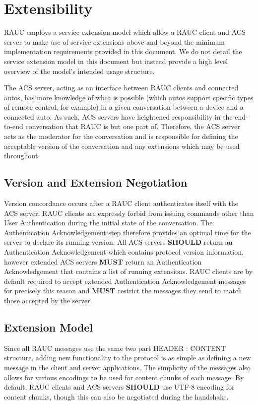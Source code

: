 
\section{Extensibility}
\label{sec:ext}
RAUC employs a service extension model which allow a RAUC client and ACS server to make use of service extensions above and beyond the minimum implementation requirements provided in this document. We do not detail the service extension model in this document but instead provide a high level overview of the model's intended usage structure.

The ACS server, acting as an interface between RAUC clients and connected autos,  has more knowledge of what is possible (which autos support specific types of remote control, for example) in a given conversation between a device and a connected auto. As such, ACS servers have heightened responsibility in the end-to-end conversation that RAUC is but one part of. Therefore, the ACS server acts as the moderator for the conversation and is responsible for defining the acceptable version of the conversation and any extensions which may be used throughout.

\subsection{Version and Extension Negotiation}
Version concordance occurs after a RAUC client authenticates itself with the ACS server. RAUC clients are expressly forbid from issuing commands other than User Authentication during the initial state of the conversation. The Authentication Acknowledgement step therefore provides an optimal time for the server to declare its running version. All ACS servers \textbf{SHOULD} return an Authentication Acknowledgement which contains protocol version information, however extended ACS servers \textbf{MUST} return an Authentication Acknowledgement that contains a list of running extensions. RAUC clients are by default required to accept extended Authentication Acknowledgement messages for precisely this reason and \textbf{MUST} restrict the messages they send to match those accepted by the server.

\subsection{Extension Model}

Since all RAUC messages use the same two part HEADER : CONTENT structure, adding new functionality to the protocol is as simple as defining a new message in the client and server applications. The simplicity of the messages also allows for various encodings to be used for content chunks of each message. By default, RAUC clients and ACS servers \textbf{SHOULD} use UTF-8 encoding for content chunks, though this can also be negotiated during the handshake.

